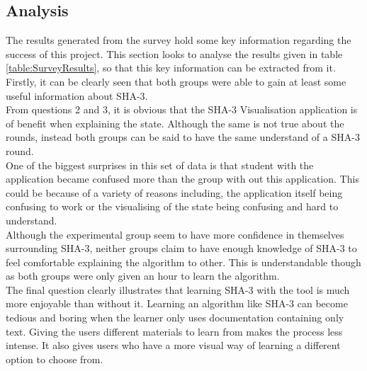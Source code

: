 \subsection{Analysis}
The results generated from the survey hold some key information regarding the success of this project. This section looks to analyse the results given in table \ref{table:SurveyResults}, so that this key information can be extracted from it.
\vspace{0mm}\\
Firstly, it can be clearly seen that both groups were able to gain at least some useful information about SHA-3.
\vspace{5mm}\\
From questions 2 and 3, it is obvious that the SHA-3 Visualisation application is of benefit when explaining the state. Although the same is not true about the rounds, instead both groups can be said to have the same  understand of a SHA-3 round.
\vspace{5mm}\\
One of the biggest surprises in this set of data is that student with the application became confused more than the group with out this application. This could be because of a variety of reasons including, the application itself being confusing to work or the visualising of the state being confusing and hard to understand.
\vspace{5mm}\\
Although the experimental group seem to have more confidence in themselves surrounding SHA-3, neither groups claim to have enough knowledge of SHA-3 to feel comfortable explaining the algorithm to other. This is understandable though as both groups were only given an hour to learn the algorithm.
\vspace{5mm}\\
The final question clearly illustrates that learning SHA-3 with the tool is much more enjoyable than without it. Learning an algorithm like SHA-3 can become tedious and boring when the learner only uses documentation containing only text. Giving the users different materials to learn from makes the process less intense. It also gives users who have a more visual way of learning a different option to choose from.
